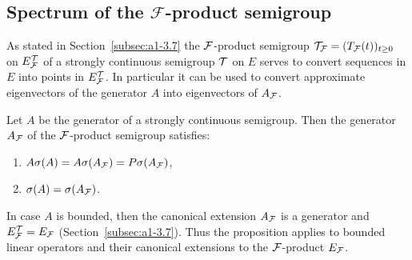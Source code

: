 \subsection{Spectrum of the 
\texorpdfstring{$\mathcal{F}$-product}{F-product} semigroup}\label{subsec:a3-4.5}
As stated in Section~\ref{subsec:a1-3.7} the $\mathcal{F}$-product semigroup $\TT_{\F} = (T_{\F}(t))_{t \geq 0}$ on $E_{\mathcal{F}}^{\mathcal{T}}$ of a strongly continuous semigroup $\mathcal{T}$ on $E$ serves to convert sequences in $E$ into points in $E_{\mathcal{F}}^{\mathcal{T}}$.
In particular it can be used to convert approximate eigenvectors of the generator $A$ into eigenvectors of\/ $A_{\mathcal{F}}$.
\begin{proposition}\label{prop:a3-4.4}
Let $A$ be the generator of a strongly continuous semigroup. Then the generator $A_{\mathcal{F}}$ of the $\mathcal{F}$-product semigroup satisfies:
\begin{enumerate}[\upshape (i)]
\item 
	$A\sigma(A) = A\sigma(A_{\mathcal{F}}) = P\sigma(A_{\mathcal{F}})$,

\item 
	$\sigma(A) = \sigma(A_{\mathcal{F}})$. 
\end{enumerate}
\end{proposition}
\begin{remark}
In case $A$ is bounded, then the canonical extension $A_{\mathcal{F}}$ is a generator and $E_{\mathcal{F}}^{\mathcal{T}} = E_{\mathcal{F}}$ (\cf Section~\ref{subsec:a1-3.7}).
Thus the proposition applies to bounded linear operators and their canonical extensions to the 
$\mathcal{F}$-product $E_{\mathcal{F}}$.
\end{remark}
